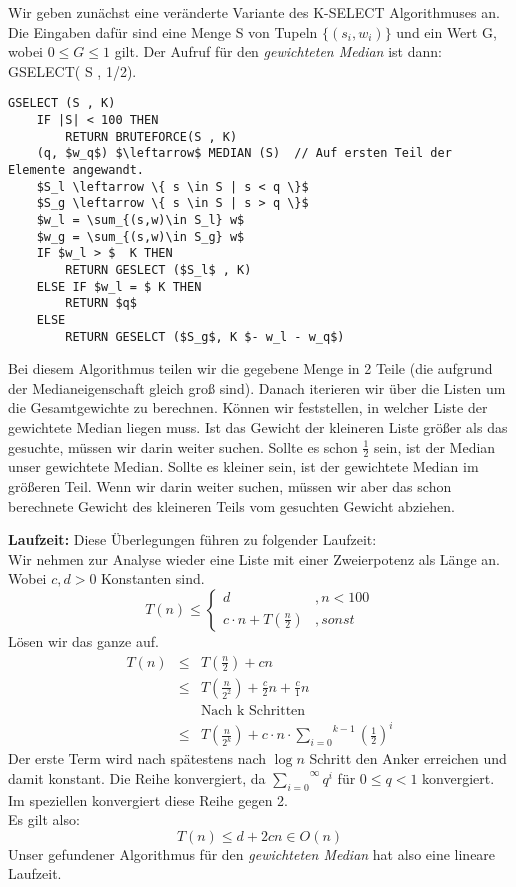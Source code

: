 \documentclass[11pt,a4paper,ngerman]{article}
\begin{document}
\begin{enumerate}[\bfseries (a)]
Wir geben zunächst eine veränderte Variante des K-SELECT Algorithmuses an. Die Eingaben dafür sind eine Menge S von Tupeln $\{ (s_i, w_i) \}$ und ein Wert G, wobei $0 \leq G \leq 1$ gilt. Der Aufruf für den \emph{gewichteten Median} ist dann:\\
GSELECT( S , 1/2).

\begin{lstlisting}
GSELECT (S , K)
	IF |S| < 100 THEN
		RETURN BRUTEFORCE(S , K)
	(q, $w_q$) $\leftarrow$ MEDIAN (S)	// Auf ersten Teil der Elemente angewandt.
	$S_l \leftarrow \{ s \in S | s < q \}$
	$S_g \leftarrow \{ s \in S | s > q \}$
	$w_l = \sum_{(s,w)\in S_l} w$
	$w_g = \sum_{(s,w)\in S_g} w$
	IF $w_l > $  K THEN
		RETURN GESLECT ($S_l$ , K)
	ELSE IF $w_l = $ K THEN
		RETURN $q$
	ELSE
		RETURN GESELCT ($S_g$, K $- w_l - w_q$)  
\end{lstlisting}

Bei diesem Algorithmus teilen wir die gegebene Menge in 2 Teile (die aufgrund der Medianeigenschaft gleich groß sind). Danach iterieren wir über die Listen um die Gesamtgewichte zu berechnen. Können wir feststellen, in welcher Liste der gewichtete Median liegen muss.
Ist das Gewicht der kleineren Liste größer als das gesuchte, müssen wir darin weiter suchen. Sollte es schon $\frac{1}{2}$ sein, ist der Median unser gewichtete Median. Sollte es kleiner sein, ist der gewichtete Median im größeren Teil. Wenn wir darin weiter suchen, müssen wir aber das schon berechnete Gewicht des kleineren Teils vom gesuchten Gewicht abziehen.

\textbf{Laufzeit:} Diese Überlegungen führen zu folgender Laufzeit:\\
Wir nehmen zur Analyse wieder eine Liste mit einer Zweierpotenz als Länge an. Wobei $c, d>0$ Konstanten sind.
$$
T(n) \leq \left\{ 
\begin{array}{lr}
d &, n < 100\\
c \cdot n + T(\frac{n}{2}) &,sonst
\end{array}
\right.
$$
Lösen wir das ganze auf.
$$
\begin{array}{rcl}
T(n) &\leq& T(\frac{n}{2}) + cn\\
&\leq& T( \frac{n}{2^2}) + \frac{c}{2}n + \frac{c}{1}n\\
&& \text{Nach k Schritten}\\
&\leq& T( \frac{n}{2^k} ) + c\cdot n \cdot  \overset{k-1}{\underset{i=0}{\sum}} \left(\frac{1}{2}\right)^i
\end{array}
$$
Der erste Term wird nach spätestens nach $\log n$ Schritt den Anker erreichen und damit konstant. Die Reihe konvergiert, da $\overset{\infty}{\underset{i=0}{\sum}} q^i$ für $0 \leq q < 1$ konvergiert. Im speziellen konvergiert diese Reihe gegen 2.\\
Es gilt also:
$$
T(n) \leq d + 2cn \in O(n)
$$
Unser gefundener Algorithmus für den \emph{gewichteten Median} hat also eine lineare Laufzeit.
\end{enumerate}
\end{document}
